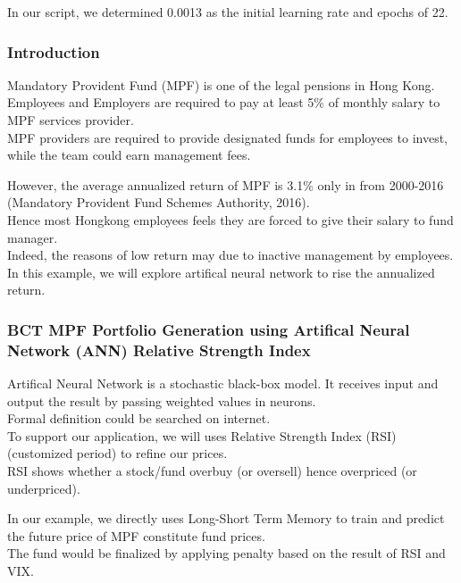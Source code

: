 \documentclass[]{article}
\begin{document}
In our script, we determined 0.0013 as the initial learning rate and
epochs of 22.

\hypertarget{introduction}{%
\subsubsection{Introduction}\label{introduction}}

Mandatory Provident Fund (MPF) is one of the legal pensions in Hong
Kong.\\
Employees and Employers are required to pay at least 5\% of monthly
salary to MPF services provider.\\
MPF providers are required to provide designated funds for employees to
invest, while the team could earn management fees.

However, the average annualized return of MPF is 3.1\% only in from
2000-2016 (Mandatory Provident Fund Schemes Authority, 2016).\\
Hence most Hongkong employees feels they are forced to give their salary
to fund manager.\\
Indeed, the reasons of low return may due to inactive management by
employees.\\
In this example, we will explore artifical neural network to rise the
annualized return.

\hypertarget{bct-mpf-portfolio-generation-using-artifical-neural-network-ann-relative-strength-index}{%
\subsubsection{BCT MPF Portfolio Generation using Artifical Neural
Network (ANN) Relative Strength
Index}\label{bct-mpf-portfolio-generation-using-artifical-neural-network-ann-relative-strength-index}}

Artifical Neural Network is a stochastic black-box model. It receives
input and output the result by passing weighted values in neurons.\\
Formal definition could be searched on internet.\\
To support our application, we will uses Relative Strength Index (RSI)
(customized period) to refine our prices.\\
RSI shows whether a stock/fund overbuy (or oversell) hence overpriced
(or underpriced).

In our example, we directly uses Long-Short Term Memory to train and
predict the future price of MPF constitute fund prices.\\
The fund would be finalized by applying penalty based on the result of
RSI and VIX.
\end{document}
